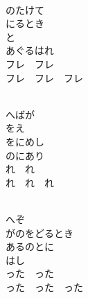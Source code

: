 \documentclass[10pt,b5j]{tarticle} %
\begin{document}
\vspace{1.5em} %
\newcommand{\linespace}{0.5em} %
\newcommand{\blocksize}{0.5\hsize} %
\newcommand{\itemmargin}{3em} %
\begin{enumerate} %
    \setlength{\itemindent}{\itemmargin} %
    \begin{minipage}[c]{\blocksize}
    
        \vspace{\linespace}
        \item~\\
        のたけて\\
        にるとき\\
        と\\
        あぐるはれ\\
        フレ　フレ\\
        フレ　フレ　フレ
        
    \end{minipage}
    \begin{minipage}[c]{\blocksize}
        
        \vspace{\linespace}
        \item~\\
        へばが\\
        をえ\\
        をにめし\\
        のにあり\\
        れ　れ\\
        れ　れ　れ
        
    \end{minipage}
    \begin{minipage}[c]{\blocksize}
        
        \vspace{\linespace}
        \item~\\
        へぞ\\
        がのをどるとき\\
        あるのとに\\
        はし\\
        った　った\\
        った　った　った
    
    \end{minipage}
\end{enumerate} %
\end{document}
